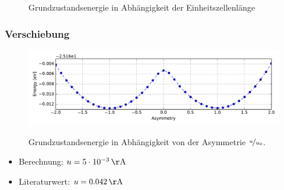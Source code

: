 \begin{frame}
\begin{minipage}{0.49\textwidth}
\begin{figure}
\captionsetup{justification = centering}
\caption{Grundzustandsenergie in Abhängigkeit der Einheitszellenlänge}
\label{image_poly_cell_len}
\end{figure}
\end{minipage}
\end{frame}

\begin{frame}
\frametitle{Verschiebung}
\begin{figure}
\centering
\centering
\includegraphics[width = \textwidth]{Images/polyacetylene/convergence/Potential_with_asymmetry}
\label{image_potential_with_asymmetry}
\caption{Grundzustandsenergie in Abhängigkeit von der Asymmetrie $\nicefrac{u}{u_0}$.}
\end{figure}
\begin{itemize}
\item Berechnung: $u = \unit[5\cdot10^{-3}]{\AA}$
\item Literaturwert: $u = \unit[0.042]{\AA}$
\end{itemize}
\end{frame}

